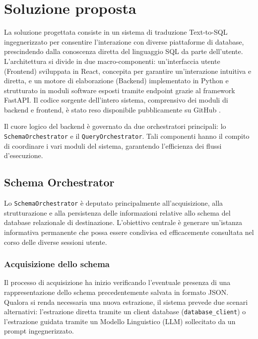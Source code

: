 \chapter{Soluzione proposta}\label{soluzione-proposta}

La soluzione progettata consiste in un sistema di traduzione Text-to-SQL
ingegnerizzato per consentire l'interazione con diverse piattaforme di
database, prescindendo dalla conoscenza diretta del linguaggio SQL da
parte dell'utente. L'architettura si divide in due macro-componenti:
un'interfaccia utente (Frontend) sviluppata in React, concepita per
garantire un'interazione intuitiva e diretta, e un motore di
elaborazione (Backend) implementato in Python e strutturato in moduli
software esposti tramite endpoint grazie al framework FastAPI. Il codice
sorgente dell'intero sistema, comprensivo dei moduli di backend e
frontend, è stato reso disponibile pubblicamente su GitHub \cite{github_project}.

Il cuore logico del backend è governato da due orchestratori principali:
lo \texttt{SchemaOrchestrator} e il \texttt{QueryOrchestrator}. Tali
componenti hanno il compito di coordinare i vari moduli del sistema,
garantendo l'efficienza dei flussi d'esecuzione.

\section{Schema Orchestrator}\label{schema-orchestrator}

Lo \texttt{SchemaOrchestrator} è deputato principalmente
all'acquisizione, alla strutturazione e alla persistenza delle
informazioni relative allo schema del database relazionale di
destinazione. L'obiettivo centrale è generare un'istanza informativa
permanente che possa essere condivisa ed efficacemente consultata nel
corso delle diverse sessioni utente.

\subsection{Acquisizione dello schema}\label{acquisizione-dello-schema}

Il processo di acquisizione ha inizio verificando l'eventuale presenza
di una rappresentazione dello schema precedentemente salvata in formato
JSON. Qualora si renda necessaria una nuova estrazione, il sistema
prevede due scenari alternativi: l'estrazione diretta tramite un client
database (\texttt{database\_client}) o l'estrazione guidata tramite un
Modello Linguistico (LLM) sollecitato da un prompt ingegnerizzato.

